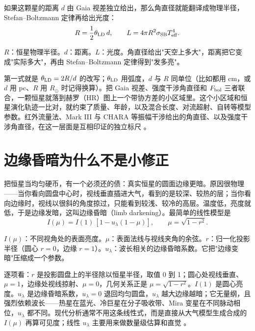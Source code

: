 如果这颗星的距离 \(d\) 由 Gaia 视差独立给出，那么角直径就能翻译成物理半径，Stefan--Boltzmann 定律再给出光度：
\begin{equation}
  R=\frac{1}{2}\theta_{\rm LD}\,d,\qquad
  L=4\pi R^2\sigma_{\rm SB}T_{\rm eff}^4 .
  \label{eq:e17-radius}
\end{equation}
\begin{formulaexplain}
\(R\)：恒星物理半径。\(d\)：距离。\(L\)：光度。角直径给出"天空上多大"，距离把它变成"实际多大"，再由 Stefan--Boltzmann 定律得到"发多亮"。
\end{formulaexplain}
第一式就是 \(\theta_{\rm LD}=2R/d\) 的改写；\(\theta_{\rm LD}\) 用弧度，\(d\) 与 \(R\) 同单位（比如都用 cm，或 \(d\) 用 pc、\(R\) 用 \(R_\odot\) 时记得换算）。把 Gaia 视差、强度干涉角直径和 \(F_{\rm bol}\) 三者联合，一颗恒星就落到赫罗（HR）图上一个带协方差的小区域里。这个小区域和恒星演化轨迹一比对，就约束了质量、年龄，以及混合长度、对流超射、自转等模型参数。红外流量法、Mark III 与 CHARA 等振幅干涉给出的角直径、以及强度干涉角直径，在这一层面是互相印证的独立标尺 \citep{1977MNRAS.180..177B,1991AJ....101.2207M,1994A&A...282..899B,2003AJ....126.2502M,2005ApJ...626..446R}。

\section{边缘昏暗为什么不是小修正}
\label{sec:e17-limb-darkening}

把恒星当均匀硬币，有一个必须还的债：真实恒星的圆面边缘更暗。原因很物理——当你看向圆盘中心时，视线垂直插进大气，看到的是较深、较热的层；当你看向边缘时，视线以很斜的角度掠过，只能看到较浅、较冷的高层。温度低，亮度就低，于是边缘发暗，这叫边缘昏暗（limb darkening）。最简单的线性模型是
\begin{equation}
  I(\mu)=I(1)\,[1-u_\lambda(1-\mu)],
  \qquad
  \mu=\sqrt{1-r^2}.
  \label{eq:e17-linear-ld}
\end{equation}
\begin{formulaexplain}
\(I(\mu)\)：不同视角处的表面亮度。\(\mu\)：表面法线与视线夹角的余弦。\(r\)：归一化投影半径（圆心 \(r=0\)，边缘 \(r=1\)）。\(u_\lambda\)：波长相关的边缘昏暗系数。它把"边缘变暗"压缩成一个参数。
\end{formulaexplain}
逐项看：\(r\) 是投影圆盘上的半径除以恒星半径，取值 0 到 1；圆心处视线垂直、\(\mu=1\)，边缘处视线掠射、\(\mu=0\)，几何关系正是 \(\mu=\sqrt{1-r^2}\)。\(I(1)\) 是圆心亮度。\(u_\lambda\) 是边缘昏暗系数，\(u_\lambda=0\) 退回均匀圆盘，\(u_\lambda\) 越大边缘越暗；它无量纲，且强烈依赖波长——热星在蓝光、冷巨星在分子吸收带、Mira 变星在不同脉动相位，\(u_\lambda\) 都不同。现代分析通常不用这条线性式，而是直接从大气模型生成合成的 \(I(\mu)\) 再算可见度；线性 \(u_\lambda\) 主要用来做数量级估算和直觉 \citep{1974MNRAS.167..475H,1992A&A...259..227D,1997A&A...327..199H,2015MNRAS.453.3821P}。

